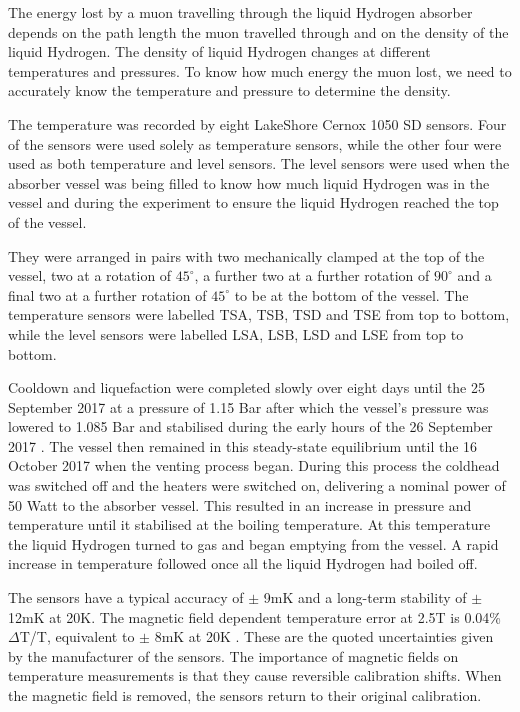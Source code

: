  The energy lost by a muon travelling through the liquid Hydrogen absorber depends on the path length the
 muon travelled through and on the density of the liquid Hydrogen. The density of liquid Hydrogen changes
 at different temperatures and pressures. To know how much energy the muon lost, we need to accurately know
 the temperature and pressure to determine the density. 
 
 The temperature was recorded by eight LakeShore Cernox 1050 SD sensors. Four of the sensors
 were used solely as temperature sensors, while the other four were used as both temperature and level
 sensors. The level sensors were used when the absorber vessel was being filled to know how much liquid
 Hydrogen was in the vessel and during the experiment to ensure the liquid Hydrogen reached the top of the
 vessel. 

 They were arranged in pairs
 with two mechanically clamped at the
 top of the vessel, two at a rotation of ${45}^{\circ}$, a further two at a further rotation of
 ${90}^{\circ}$ and a final two at a further rotation of ${45}^{\circ}$ to be at the bottom of the vessel.
 The temperature sensors were labelled TSA, TSB, TSD and TSE from top to bottom, while the level sensors
 were labelled LSA, LSB, LSD and LSE from top to bottom.

Cooldown and liquefaction were completed slowly over eight days until the 25 September 2017 at a pressure of 1.15 Bar after which the vessel's pressure was lowered to 1.085 Bar and stabilised during the early hours of the 26 September 2017 \cite{1748-0221-13-09-T09008}. The vessel then remained in this steady-state equilibrium until the 16 October 2017 when the venting process began. During this process the coldhead was switched off and the heaters were switched on, delivering a nominal power of 50 Watt to the absorber vessel. This resulted in an increase in pressure and temperature until it stabilised at the boiling temperature. At this temperature the liquid Hydrogen turned to gas and began emptying from the vessel. A rapid increase in temperature followed once all the liquid Hydrogen had boiled off.

  The sensors have a typical accuracy of $\mathrm{\pm}$ 9mK and a long-term stability of
 $\mathrm{\pm}$ 12mK at 20K. The magnetic field dependent
 temperature error at 2.5T is 0.04\% $\Delta$T/T, equivalent to $\mathrm{\pm}$ 8mK at 20K
 \cite{CernoxRTDs} \cite{TemperatureMeasurement}. These are the quoted uncertainties given by the manufacturer
 of the sensors. The importance of magnetic fields on temperature measurements is that they cause
 reversible calibration shifts. When the magnetic field is removed, the sensors return to their original
 calibration.


